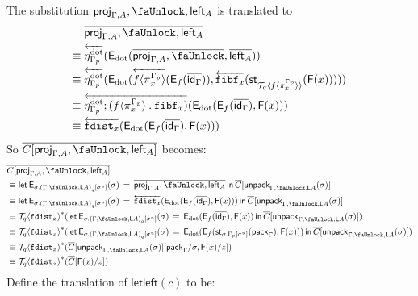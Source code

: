 \documentclass[10pt]{article}
\theoremstyle{definition}
\newcommand{\id}{\mathsf{id}}
\newcommand{\rewrite}[2]{\overleftarrow{#1}(#2)}
\newcommand\St[2]{\ensuremath{{#1}^*(#2)}}
\newcommand\StI[2]{\ensuremath{\mathsf{st}_{#1}(#2)}}
\newcommand\FI[1]{\ensuremath{\mathsf{F}{(#1)}}}
\newcommand\EEs[4]{\ensuremath{\mathsf{let} \, \mathsf{E}_{#1}(#3) \, = \, {#2} \, \mathsf{in} \, #4}}
\newcommand\EIs[2]{\ensuremath{\mathsf{E}_{#1}{(#2)}}}
\newcommand\ApEl[2]{\mathcal{T}_{#1}\langle#2\rangle}
\newcommand\bdot[0]{\mathbin{.}}
\newcommand\ap[2]{\ensuremath{#1 \langle #2 \rangle }}
\newcommand\pack[1]{\ensuremath{\mathsf{pack}_{#1}}}
\newcommand\unpack[2]{\ensuremath{\mathsf{unpack}_{#1}(#2)}}
\newcommand\unp[2]{\ensuremath{{#2}^u}}
\newcommand{\modeof}[1]{{#1}_p}
\newcommand{\modeofq}[1]{{#1}_q}
\newcommand{\sdot}{\ensuremath{\mathrm{dot}}}
\newcommand{\upstairs}[1]{\overline{#1}}
\newcommand\proj[1]{\ensuremath{\mathsf{proj}_{#1}}}
\newcommand\fibf[1]{\ensuremath{\mathtt{fibf}_{#1}}}
\newcommand\fdist[1]{\ensuremath{\mathtt{fdist}_{#1}}}
\newcommand{\lock}{\text{\faUnlock}}
\newcommand{\Ltype}[1]{\mathsf{L}{#1}}
\newcommand{\LI}[1]{\mathsf{left}_{#1}}
\newcommand{\LE}[1]{\mathsf{letleft}({#1})}
\begin{document}
\begin{enumerate}
The substitution $\proj{\Gamma, A}, \lock, \LI{A}$ is translated to 
\begin{align*}
&\upstairs{\proj{\Gamma, A}, \lock, \LI{A}} \\
\equiv{} &\rewrite{\eta^\sdot_{\modeof{\Gamma}}}{\EIs{\sdot}{\upstairs{\proj{\Gamma, A}, \lock}, \upstairs{\LI{A}}}} \\
\equiv{} &\rewrite{\eta^\sdot_{\modeof{\Gamma}}}{\EIs{\sdot}{\rewrite{\ap{f}{\pi^{\modeof{\Gamma}}_x}}{\EIs{f}{\upstairs{\id_\Gamma}}}, \rewrite{\fibf{x}}{\StI{\ApEl{q}{\ap{f}{\pi^{\modeof{\Gamma}}_x}}}{\FI{x}}}}} \\
\equiv{} &\rewrite{\eta^\sdot_{\modeof{\Gamma}};(\ap{f}{\pi^{\modeof{\Gamma}}_x} \bdot \fibf{x})}{\EIs{\sdot}{\EIs{f}{\upstairs{\id_\Gamma}}, \FI{x}}} \\
\equiv{} &\rewrite{\fdist{x}}{\EIs{\sdot}{\EIs{f}{\upstairs{\id_\Gamma}}, \FI{x}}} 
\end{align*}
So $\upstairs{C[\proj{\Gamma, A}, \lock, \LI{A}]}$ becomes:
\begin{align*}
&\upstairs{C[\proj{\Gamma, A}, \lock, \LI{A}]} \\
&\equiv \EEs{\sigma.\modeofq{(\Gamma, \lock, \Ltype{A})}[\unp{\Gamma, \lock, \Ltype{A}}{\sigma}]}{\upstairs{\proj{\Gamma, A}, \lock, \LI{A}}}{\sigma}{\upstairs{C}[\unpack{\Gamma, \lock, \Ltype{A}}{\sigma}]} \\
&\equiv \EEs{\sigma.\modeofq{(\Gamma, \lock, \Ltype{A})}[\unp{\Gamma, \lock, \Ltype{A}}{\sigma}]}{\rewrite{\fdist{x}}{\EIs{\sdot}{\EIs{f}{\upstairs{\id_\Gamma}}, \FI{x}}} }{\sigma}{\upstairs{C}[\unpack{\Gamma, \lock, \Ltype{A}}{\sigma}]} \\
&\equiv \St{\ApEl{q}{\fdist{x}}}{\EEs{\sigma.\modeofq{(\Gamma, \lock, \Ltype{A})}[\unp{\Gamma, \lock, \Ltype{A}}{\sigma}]}{\EIs{\sdot}{\EIs{f}{\upstairs{\id_\Gamma}}, \FI{x}}}{\sigma}{\upstairs{C}[\unpack{\Gamma, \lock, \Ltype{A}}{\sigma}]}} \\
&\equiv \St{\ApEl{q}{\fdist{x}}}{\EEs{\sigma.\modeofq{(\Gamma, \lock, \Ltype{A})}[\unp{\Gamma, \lock, \Ltype{A}}{\sigma}]}{\EIs{\sdot}{\EIs{f}{\StI{\sigma.\modeof{\Gamma}[\unp{\Gamma}{\sigma}]}{\pack{\Gamma}}, \FI{x}}}}{\sigma}{\upstairs{C}[\unpack{\Gamma, \lock, \Ltype{A}}{\sigma}]}} \\
&\equiv \St{\ApEl{q}{\fdist{x}}}{\upstairs{C}[\unpack{\Gamma, \lock, \Ltype{A}}{\sigma}][\pack{\Gamma}/\sigma, \FI{x}/z]} \\
&\equiv \St{\ApEl{q}{\fdist{x}}}{\upstairs{C}[\FI{x}/z]}
\end{align*}
Define the translation of $\LE{c}$ to be:

\end{enumerate}
\end{document}
